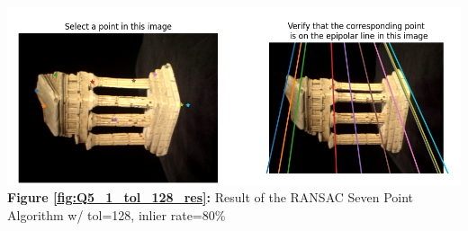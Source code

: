 \begin{your_solution}[title=Q5.1 continued, height=22.5cm,width=\linewidth]
	\hfill
	\begin{minipage}{1\linewidth}
		\centering
		\includegraphics[width=1\linewidth, height=0.39\columnwidth]{../Q5_1_ransac_seven_tol_128_result.png}
		\textbf{Figure \ref{fig:Q5_1_tol_128_res}:} Result of the RANSAC Seven Point Algorithm w/ tol=128, inlier rate=80\% %
		\label{fig:Q5_1_tol_128_res}         %
	\end{minipage}
\end{your_solution}
\newpage
